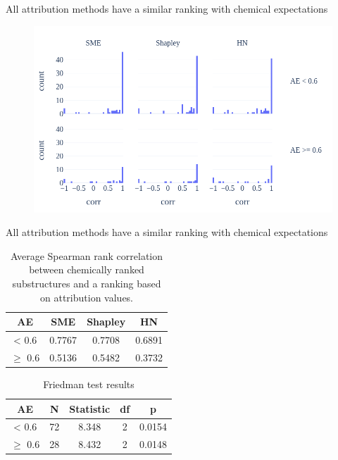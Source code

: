 \documentclass[aspectratio=169]{beamer}
\begin{document}
\begin{frame}{All attribution methods have a similar ranking with chemical expectations}

    \begin{figure}[h]
        \centering
        \includegraphics[scale=0.40]{../thesis/Fig/spearman_rank_correlation_manual_vs_attribution.png}
    \end{figure}
   
\end{frame}


\begin{frame}{All attribution methods have a similar ranking with chemical expectations}

    \begin{table}[h]
        \centering
        \caption{Average Spearman rank correlation between chemically ranked substructures and 
        a ranking based on attribution values.}
        \begin{tabular}{cccc}
        \toprule
        AE & SME & Shapley & HN \\
        \midrule
         < 0.6 & 0.7767 & 0.7708 & 0.6891 \\
        $\ge$ 0.6 & 0.5136 & 0.5482 & 0.3732 \\
         \bottomrule
        \end{tabular}
    \end{table}

    \begin{table}[h]
        \centering
        \caption{Friedman test results}
        \begin{tabular}{ccccc}
        \toprule
        AE & N & Statistic & df & p \\
        \midrule
         < 0.6 & 72 & 8.348 & 2 & 0.0154  \\
        $\ge$ 0.6 & 28 & 8.432 & 2 & 0.0148 \\
         \bottomrule
        \end{tabular}
    \end{table}

\end{frame}
\end{document}
